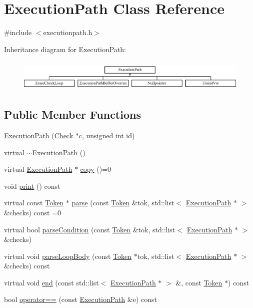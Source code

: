 \hypertarget{class_execution_path}{\section{Execution\-Path Class Reference}
\label{class_execution_path}
}


{\ttfamily \#include $<$executionpath.\-h$>$}

Inheritance diagram for Execution\-Path\-:\begin{figure}[H]
\begin{center}
\leavevmode
\includegraphics[height=1.530055cm]{class_execution_path}
\end{center}
\end{figure}
\subsection*{Public Member Functions}
\begin{DoxyCompactItemize}
\item 
\hyperlink{class_execution_path_adb874f7ac0c3a1c7ef2499966a71b09d}{Execution\-Path} (\hyperlink{class_check}{Check} $\ast$c, unsigned int id)
\item 
virtual \hyperlink{class_execution_path_aeffc0aae0d9e96fdfe575bb66c9ecb0e}{$\sim$\-Execution\-Path} ()
\item 
virtual \hyperlink{class_execution_path}{Execution\-Path} $\ast$ \hyperlink{class_execution_path_abff59a630b1f49070717dc0c8cfdc1d6}{copy} ()=0
\item 
void \hyperlink{class_execution_path_a4917997ed0298be3af6e98cce830ea48}{print} () const 
\item 
virtual const \hyperlink{class_token}{Token} $\ast$ \hyperlink{class_execution_path_ab00e0194ec0b01fef186c1964b282844}{parse} (const \hyperlink{class_token}{Token} \&tok, std\-::list$<$ \hyperlink{class_execution_path}{Execution\-Path} $\ast$ $>$ \&checks) const =0
\item 
virtual bool \hyperlink{class_execution_path_ad85c91b82a99ebf2241557c888a67cb0}{parse\-Condition} (const \hyperlink{class_token}{Token} \&tok, std\-::list$<$ \hyperlink{class_execution_path}{Execution\-Path} $\ast$ $>$ \&checks)
\item 
virtual void \hyperlink{class_execution_path_a5a1496f0291add24ba3188e240891bef}{parse\-Loop\-Body} (const \hyperlink{class_token}{Token} $\ast$tok, std\-::list$<$ \hyperlink{class_execution_path}{Execution\-Path} $\ast$ $>$ \&checks) const 
\item 
virtual void \hyperlink{class_execution_path_a51f142fffb8efb40a0634d12d2da53c7}{end} (const std\-::list$<$ \hyperlink{class_execution_path}{Execution\-Path} $\ast$ $>$ \&, const \hyperlink{class_token}{Token} $\ast$) const 
\item 
bool \hyperlink{class_execution_path_ac5373c53c190d9abfe80bee24a4a18bf}{operator==} (const \hyperlink{class_execution_path}{Execution\-Path} \&e) const 
\end{DoxyCompactItemize}
